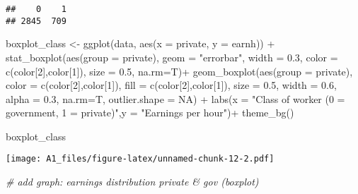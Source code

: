 \documentclass[
]{article}
\newenvironment{Shaded}{\begin{snugshade}}{\end{snugshade}}
\newcommand{\AttributeTok}[1]{\textcolor[rgb]{0.77,0.63,0.00}{#1}}
\newcommand{\CommentTok}[1]{\textcolor[rgb]{0.56,0.35,0.01}{\textit{#1}}}
\newcommand{\ConstantTok}[1]{\textcolor[rgb]{0.00,0.00,0.00}{#1}}
\newcommand{\DecValTok}[1]{\textcolor[rgb]{0.00,0.00,0.81}{#1}}
\newcommand{\FloatTok}[1]{\textcolor[rgb]{0.00,0.00,0.81}{#1}}
\newcommand{\FunctionTok}[1]{\textcolor[rgb]{0.00,0.00,0.00}{#1}}
\newcommand{\NormalTok}[1]{#1}
\newcommand{\OtherTok}[1]{\textcolor[rgb]{0.56,0.35,0.01}{#1}}
\newcommand{\SpecialCharTok}[1]{\textcolor[rgb]{0.00,0.00,0.00}{#1}}
\newcommand{\StringTok}[1]{\textcolor[rgb]{0.31,0.60,0.02}{#1}}
\begin{document}
\begin{verbatim}
##    0    1 
## 2845  709
\end{verbatim}

\begin{Shaded}
\begin{Highlighting}[]
\NormalTok{boxplot\_class }\OtherTok{\textless{}{-}} \FunctionTok{ggplot}\NormalTok{(data, }\FunctionTok{aes}\NormalTok{(}\AttributeTok{x =}\NormalTok{ private, }\AttributeTok{y =}\NormalTok{ earnh)) }\SpecialCharTok{+}
  \FunctionTok{stat\_boxplot}\NormalTok{(}\FunctionTok{aes}\NormalTok{(}\AttributeTok{group =}\NormalTok{ private), }\AttributeTok{geom =} \StringTok{"errorbar"}\NormalTok{, }\AttributeTok{width =} \FloatTok{0.3}\NormalTok{,}
               \AttributeTok{color =} \FunctionTok{c}\NormalTok{(color[}\DecValTok{2}\NormalTok{],color[}\DecValTok{1}\NormalTok{]), }\AttributeTok{size =} \FloatTok{0.5}\NormalTok{, }\AttributeTok{na.rm=}\NormalTok{T)}\SpecialCharTok{+}
  \FunctionTok{geom\_boxplot}\NormalTok{(}\FunctionTok{aes}\NormalTok{(}\AttributeTok{group =}\NormalTok{ private),}
               \AttributeTok{color =} \FunctionTok{c}\NormalTok{(color[}\DecValTok{2}\NormalTok{],color[}\DecValTok{1}\NormalTok{]), }\AttributeTok{fill =} \FunctionTok{c}\NormalTok{(color[}\DecValTok{2}\NormalTok{],color[}\DecValTok{1}\NormalTok{]),}
               \AttributeTok{size =} \FloatTok{0.5}\NormalTok{, }\AttributeTok{width =} \FloatTok{0.6}\NormalTok{, }\AttributeTok{alpha =} \FloatTok{0.3}\NormalTok{, }\AttributeTok{na.rm=}\NormalTok{T, }\AttributeTok{outlier.shape =} \ConstantTok{NA}\NormalTok{) }\SpecialCharTok{+}
  \FunctionTok{labs}\NormalTok{(}\AttributeTok{x =} \StringTok{"Class of worker (0 = government, 1 = private)"}\NormalTok{,}\AttributeTok{y =} \StringTok{"Earnings per hour"}\NormalTok{)}\SpecialCharTok{+}
  \FunctionTok{theme\_bg}\NormalTok{()}

\NormalTok{boxplot\_class}
\end{Highlighting}
\end{Shaded}

\texttt{[image: A1\_files/figure-latex/unnamed-chunk-12-2.pdf]}

\begin{Shaded}
\begin{Highlighting}[]
\CommentTok{\# add graph: earnings distribution private \& gov (boxplot)}
\end{Highlighting}
\end{Shaded}

\begin{Shaded}
\end{Shaded}
\end{document}
